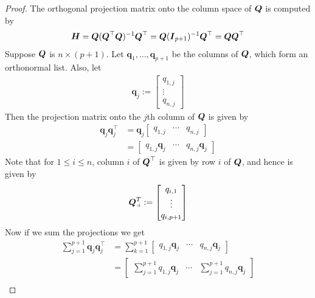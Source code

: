 \documentclass[12pt]{article}
\begin{document}
\begin{enumerate}

\begin{proof}
	The orthogonal projection matrix onto the column space of $\boldsymbol{Q}$ is computed by
	\begin{align*}
		\boldsymbol{H} =\boldsymbol{Q}(\boldsymbol{Q}^\top \boldsymbol{Q})^{-1}\boldsymbol{Q}^\top=\boldsymbol{Q}(\boldsymbol{I}_{p+1})^{-1}\boldsymbol{Q}^\top=\boldsymbol{Q} \boldsymbol{Q}^\top
	\end{align*}
	Suppose $\boldsymbol{Q}$ is $n\times (p+1)$.
	Let $\mathbf{q}_1,\ldots,\mathbf{q}_{p+1}$ be the columns of $\boldsymbol{Q}$, which form
	an orthonormal list. Also, let
	\begin{align*}
		\mathbf{q}_j:=\begin{bmatrix}
			q_{1,j}\\
			\vdots\\
			q_{n,j}
		\end{bmatrix}
	\end{align*}
	Then the projection matrix onto the $j$th column of $\boldsymbol{Q}$ is given by
	\begin{align*}
		\mathbf{q}_j\mathbf{q}_j^\top&=
		\mathbf{q}_j
		\begin{bmatrix}
			q_{1,j} & \cdots & q_{n,j}
		\end{bmatrix}\\
		&=\begin{bmatrix}
			q_{1,j}\mathbf{q}_j & \cdots & q_{n, j}\mathbf{q}_j
		\end{bmatrix}
	\end{align*}
	Note that for $1\leq i\leq n$, column $i$ of $\boldsymbol{Q}^\top$ is given by
	row $i$ of $\boldsymbol{Q}$, and hence is given by
	\begin{align*}
		\boldsymbol{Q}^T_{\cdot i}:=\begin{bmatrix}
			q_{i, 1}\\
			\vdots\\
			q_{i,p+1}
		\end{bmatrix}
	\end{align*}
	Now if we sum the projections we get
	\begin{align*}
		\sum_{j=1}^{p+1}\mathbf{q}_j\mathbf{q}_j^\top
		&=\sum_{k=1}^{p+1}\begin{bmatrix}
			q_{1,j}\mathbf{q}_j & \cdots & q_{n, j}\mathbf{q}_j
		\end{bmatrix}\\
		&=\begin{bmatrix}
			\sum_{j=1}^{p+1}q_{1,j}\mathbf{q}_j & \cdots & \sum_{j=1}^{p+1}q_{n,j}\mathbf{q}_j
		\end{bmatrix}\\

\end{align*}
\end{proof}
\end{enumerate}
\end{document}
